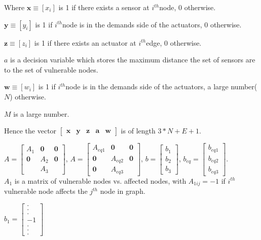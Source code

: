 \documentclass[authoryear,preprint,review,12pt]{elsarticle}
\begin{document}
Where $\mathbf{x}\equiv[x_{i}]$ is 1 if there exists a sensor at
$i^{th}$node, 0 otherwise.

$\mathbf{y}\equiv[y_{i}]$ is 1 if $i^{th}$node is in the demands
side of the actuators, 0 otherwise.

$\mathbf{z}\equiv[z_{i}]$ is 1 if there exists an actuator at $i^{th}$edge,
0 otherwise.

$a$ is a decision variable which stores the maximum distance the
set of sensors are to the set of vulnerable nodes.

$\mathbf{w}\equiv[w_{i}]$ is 1 if $i^{th}$node is in the demands
side of the actuators, a large number($N$) otherwise.

$M$ is a large number.

Hence the vector $\left[\mathbf{\begin{array}{ccccc}
\mathbf{x} & y & z & a & w\end{array}}\right]$ is of length $3*N+E+1$.

$A=\left[\begin{array}{ccc}
A_{1} & \mathbf{0} & \mathbf{0}\\
\mathbf{0} & A_{2} & \mathbf{0}\\
\mathbf{} & A_{3}
\end{array}\right]$, $A=\left[\begin{array}{ccc}
A_{eq1} & \mathbf{0} & \mathbf{0}\\
\mathbf{0} & A_{eq2} & \mathbf{0}\\
\mathbf{0} & A_{eq3}
\end{array}\right]$, $b=\left[\begin{array}{c}
b_{1}\\
b_{2}\\
b_{3}
\end{array}\right]$, $b_{eq}=\left[\begin{array}{c}
b_{eq1}\\
b_{eq2}\\
b_{eq3}
\end{array}\right]$.\\

$A_{1}$ is a matrix of vulnerable nodes vs. affected nodes, with
$A_{1ij}=-1$ if $i^{th}$ vulnerable node affects the $j^{th}$ node
in graph.

$b_{1}=\left[\begin{array}{c}
.\\
.\\
.\\
-1\\
.\\
.\\
.
\end{array}\right]$
\end{document}
